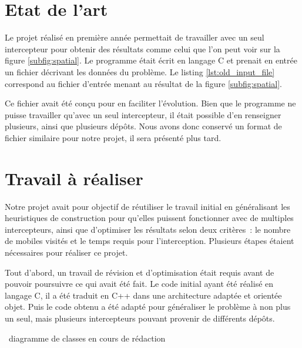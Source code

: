     \section{Etat de l'art}

    	Le projet réalisé en première année permettait de travailler avec un seul intercepteur pour obtenir des résultats comme celui que l'on peut voir sur la figure \ref{subfig:spatial}. Le programme était écrit en langage C et prenait en entrée un fichier décrivant les données du problème. Le listing \ref{lst:old_input_file} correspond au fichier d'entrée menant au résultat de la figure \ref{subfig:spatial}.

    	Ce fichier avait été conçu pour en faciliter l'évolution. Bien que le programme ne puisse travailler qu'avec un seul intercepteur, il était possible d'en renseigner plusieurs, ainsi que plusieurs dépôts. Nous avons donc conservé un format de fichier similaire pour notre projet, il sera présenté plus tard.

    	\begin{code}
    		\label{lst:old_input_file}
    	\end{code}

    \section{Travail à réaliser}
    	Notre projet avait pour objectif de réutiliser le travail initial en généralisant les heuristiques de construction pour qu'elles puissent fonctionner avec de multiples intercepteurs, ainsi que d'optimiser les résultats selon deux critères : le nombre de mobiles visités et le temps requis pour l'interception.
Plusieurs étapes étaient nécessaires pour réaliser ce projet.

Tout d'abord, un travail de révision et d'optimisation était requis avant de pouvoir poursuivre ce qui avait été fait. Le code initial ayant été réalisé en langage C, il a été traduit en C++ dans une architecture adaptée et orientée objet. Puis le code obtenu a été adapté pour généraliser le problème à non plus un seul, mais plusieurs intercepteurs pouvant provenir de différents dépôts.

\TODO diagramme de classes
\TODO en cours de rédaction

